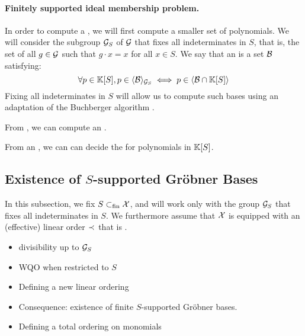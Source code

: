 \paragraph{Finitely supported ideal membership problem.}
In order to compute a , we will first compute
a smaller set of polynomials.
We will consider the subgroup $\mathcal{G}_S$ of $\mathcal{G}$ that fixes
all indeterminates in $S$, that is, the set of all $g \in \mathcal{G}$
such that $g \cdot x = x$ for all $x \in S$.
We say that
an  is a set $\Basis$
satisfying:
\begin{equation*}
    \label{eq:supp-grob}
    \forall p \in \poly{\K}{S},
    p \in \gen{\Basis}{\group_S}
    \iff
    p \in \gen{\Basis \cap \poly{\K}{S}}{}
\end{equation*}
Fixing all indeterminates in $S$ will allow us to compute 
such bases using an adaptation of the Buchberger algorithm
\cite{BUCH76}.

\begin{lemma}
    From , we can compute
    an .
\end{lemma}

\begin{lemma}
    From an , we can can decide
    the 
    for polynomials in $\mathbb{K}[S]$.
\end{lemma}

\subsection{Existence of $S$-supported Gröbner Bases}
\label{subsec:weakgb}

In this subsection, we fix $S \subset_{\text{fin}} \mathcal{X}$, and will work only with the group
$\mathcal{G}_S$ that fixes all indeterminates in $S$. We furthermore assume that
$\mathcal{X}$ is equipped with an (effective) linear order $\prec_{}$ that is
.

\begin{itemize}
    \item divisibility up to $\mathcal{G}_S$
    \item WQO when restricted to $S$
    \item Defining a new linear ordering 
    \item Consequence: existence of finite $S$-supported Gröbner bases.
    \item Defining a total ordering on monomials
\end{itemize}

